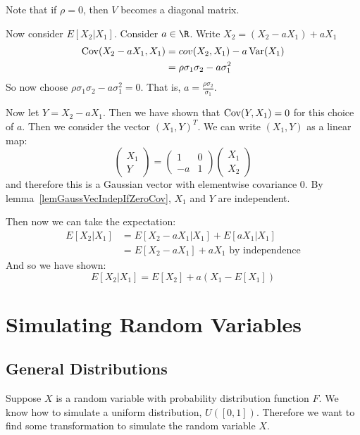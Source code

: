 \documentclass[../Main.tex]{subfiles}
\begin{document}
\begin{example}
    Note that if $\rho = 0$, then $V$ becomes a diagonal matrix.

    Now consider $E[X_2 | X_1]$. Consider $a \in \R$. Write $X_2 = (X_2 - a X_1) + aX_1$
    \begin{align*}
        \operatorname{Cov}(X_2 - aX_1, X_1) &= cov(X_2, X_1) - a\operatorname{Var}(X_1) \\
        &= \rho \sigma_1 \sigma_2 - a\sigma_1^2
    \end{align*}
    So now choose $\rho \sigma_1 \sigma_2 - a\sigma_1^2 = 0$. That is, $a = \frac{\rho \sigma_2}{\sigma_1}$.

    Now let $Y = X_2 - aX_1$. Then we have shown that $\operatorname{Cov}(Y, X_1) = 0$ for this choice of $a$. Then we consider the vector $(X_1, Y)^T$.
    We can write $(X_1, Y)$ as a linear map:
    \begin{equation*}
        \begin{pmatrix}X_1 \\ Y\end{pmatrix} = \begin{pmatrix}1 & 0 \\ -a & 1\end{pmatrix}\begin{pmatrix}X_1 \\ X_2\end{pmatrix}
    \end{equation*}
    and therefore this is a Gaussian vector with elementwise covariance 0. By lemma~\ref{lemGaussVecIndepIfZeroCov}, $X_1$ and $Y$ are independent.

    Then now we can take the expectation:
    \begin{align*}
        E[X_2 | X_1] &= E[X_2 - aX_1 | X_1] + E[aX_1 | X_1] \\
        &= E[X_2 - aX_1] + aX_1 \text{ by independence}
    \end{align*}
    And so we have shown:
    \begin{equation}
        E[X_2 | X_1] = E[X_2] + a(X_1 - E[X_1])
        \label{eqnCondExpecGaussVars}
    \end{equation}
\end{example}
\section{Simulating Random Variables}
\subsection{General Distributions}
Suppose $X$ is a random variable with probability distribution function $F$. We know how to simulate a uniform distribution, $U([0, 1])$. Therefore we want to find some transformation to simulate the random variable $X$.
\end{document}
